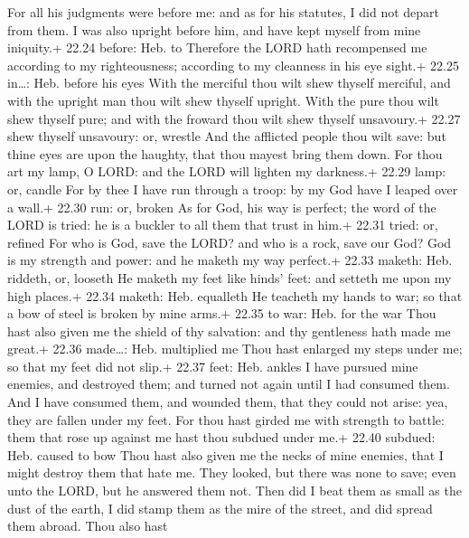  For all his judgments were before me: and as for his
statutes, I did not depart from them.  I was also upright
before him, and have kept myself from mine iniquity.+ 22.24 before: Heb.
to  Therefore the LORD hath recompensed me according to my
righteousness; according to my cleanness in his eye sight.+ 22.25
in\ldots: Heb. before his eyes  With the merciful thou wilt
shew thyself merciful, and with the upright man thou wilt shew thyself
upright.  With the pure thou wilt shew thyself pure; and
with the froward thou wilt shew thyself unsavoury.+ 22.27 shew thyself
unsavoury: or, wrestle  And the afflicted people thou wilt
save: but thine eyes are upon the haughty, that thou mayest bring them
down.  For thou art my lamp, O LORD: and the LORD will
lighten my darkness.+ 22.29 lamp: or, candle  For by thee I
have run through a troop: by my God have I leaped over a wall.+ 22.30
run: or, broken  As for God, his way is perfect; the word
of the LORD is tried: he is a buckler to all them that trust in him.+
22.31 tried: or, refined  For who is God, save the LORD?
and who is a rock, save our God?  God is my strength and
power: and he maketh my way perfect.+ 22.33 maketh: Heb. riddeth, or,
looseth  He maketh my feet like hinds' feet: and setteth me
upon my high places.+ 22.34 maketh: Heb. equalleth  He
teacheth my hands to war; so that a bow of steel is broken by mine
arms.+ 22.35 to war: Heb. for the war  Thou hast also given
me the shield of thy salvation: and thy gentleness hath made me great.+
22.36 made\ldots: Heb. multiplied me  Thou hast enlarged my
steps under me; so that my feet did not slip.+ 22.37 feet: Heb. ankles
 I have pursued mine enemies, and destroyed them; and
turned not again until I had consumed them.  And I have
consumed them, and wounded them, that they could not arise: yea, they
are fallen under my feet.  For thou hast girded me with
strength to battle: them that rose up against me hast thou subdued under
me.+ 22.40 subdued: Heb. caused to bow  Thou hast also
given me the necks of mine enemies, that I might destroy them that hate
me.  They looked, but there was none to save; even unto the
LORD, but he answered them not.  Then did I beat them as
small as the dust of the earth, I did stamp them as the mire of the
street, and did spread them abroad.  Thou also hast
